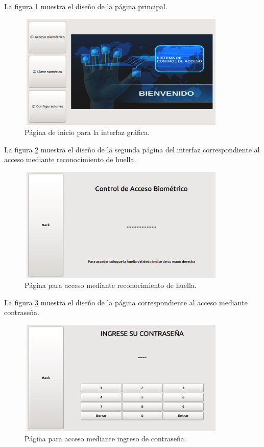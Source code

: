 La figura \ref{fig:paginicio} muestra el diseño de la página principal.
\begin{figure}[H]
	\centering
	\includegraphics[height=5.5cm,width=10cm]{./Figures/paginicio.png}
	\caption{Página de inicio para la interfaz gráfica.}
	\label{fig:paginicio}
\end{figure}

La figura \ref{fig:paginabio} muestra el diseño de la segunda página del interfaz correspondiente al acceso mediante reconocimiento de huella.
\begin{figure}[H]
	\centering
	\includegraphics[height=5.5cm,width=10cm]{./Figures/paginabio.png}
	\caption{Página para acceso mediante reconocimiento de huella.}
	\label{fig:paginabio}
\end{figure}

La figura \ref{fig:pagcontrasena} muestra el diseño de la página correspondiente al acceso mediante contraseña.
\begin{figure}[H]
	\centering
	\includegraphics[height=5.5cm,width=10cm]{./Figures/pagcontrasena.png}
	\caption{Página para acceso mediante ingreso de contraseña.}
	\label{fig:pagcontrasena}
\end{figure}

